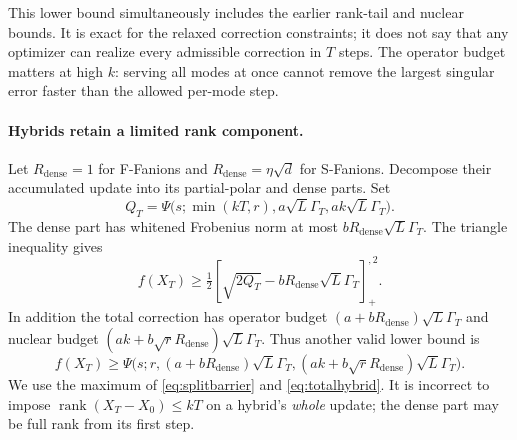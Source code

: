 \documentclass[11pt]{article}
\newcommand{\rank}{\operatorname{rank}}
\newcommand{\pos}[1]{[#1]_+}
\begin{document}
This lower bound simultaneously includes the earlier rank-tail and nuclear
bounds. It is exact for the relaxed correction constraints; it does not say
that any optimizer can realize every admissible correction in $T$ steps.
The operator budget matters at high $k$: serving all modes at once cannot
remove the largest singular error faster than the allowed per-mode step.

\paragraph{Hybrids retain a limited rank component.}
Let $R_{\mathrm{dense}}=1$ for F-Fanions and
$R_{\mathrm{dense}}=\eta\sqrt d$ for S-Fanions. Decompose their accumulated
update into its partial-polar and dense parts. Set
\[
 Q_T=\Psi\bigl(s;\min(kT,r),a\sqrt L\Gamma_T,
                         ak\sqrt L\Gamma_T\bigr).
\]
The dense part has whitened Frobenius norm at most
$bR_{\mathrm{dense}}\sqrt L\Gamma_T$. The triangle inequality gives
\begin{equation}\label{eq:splitbarrier}
 f(X_T)\geq\tfrac12
 \pos{\sqrt{2Q_T}-bR_{\mathrm{dense}}\sqrt L\Gamma_T}^{,2}.
\end{equation}
In addition the total correction has operator budget
$(a+bR_{\mathrm{dense}})\sqrt L\Gamma_T$ and nuclear budget
$(ak+b\sqrt r R_{\mathrm{dense}})\sqrt L\Gamma_T$.
Thus another valid lower bound is
\begin{equation}\label{eq:totalhybrid}
 f(X_T)\geq\Psi\bigl(s;r,
 (a+bR_{\mathrm{dense}})\sqrt L\Gamma_T,
 (ak+b\sqrt rR_{\mathrm{dense}})\sqrt L\Gamma_T\bigr).
\end{equation}
We use the maximum of \eqref{eq:splitbarrier} and \eqref{eq:totalhybrid}.
It is incorrect to impose $\rank(X_T-X_0)\leq kT$ on a hybrid's
\emph{whole} update; the dense part may be full rank from its first step.
\end{document}
